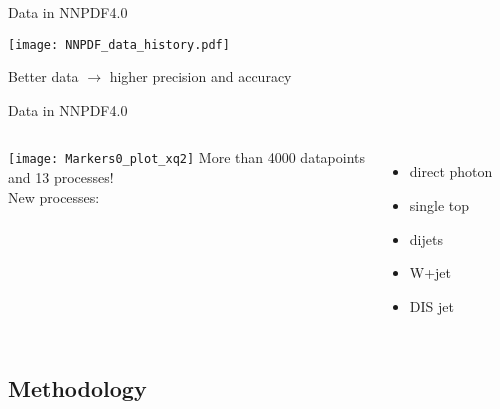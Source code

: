 \begin{frame}[t]{Data in NNPDF4.0}
  \begin{center}
    \texttt{[image: NNPDF\_data\_history.pdf]}
  \end{center}
  Better data $\rightarrow$ higher precision and accuracy
\end{frame}


\begin{frame}[t]{Data in NNPDF4.0}
  \begin{columns}
          \texttt{[image: Markers0\_plot\_xq2]}
          More than 4000 datapoints\\
          and 13 processes!\\
          \vspace*{1em}
          New processes:
          \begin{itemize}
              \item direct photon
              \item single top
              \item dijets
              \item W+jet
              \item DIS jet
          \end{itemize}
  \end{columns}
\end{frame}


\subsection{Methodology}


